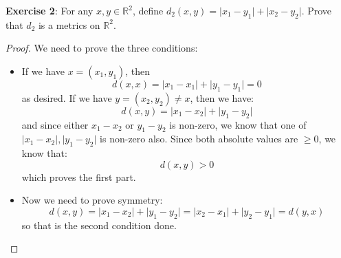 \documentclass{article}
\begin{document}
\textbf{Exercise 2}: For any $x, y \in \mathbb{R}^{2}$, define $d_{2}(x, y) = \lvert x_{1} - y_{1} \rvert + \lvert x_{2} - y_{2} \rvert$. Prove that $d_{2}$ is a metrics on $\mathbb{R}^{2}$.
    \begin{proof}
        We need to prove the three conditions:
            \begin{itemize}
                \item If we have $x = (x_{1}, y_{1})$, then 
                    \begin{equation*}
                        d(x, x) = \lvert x_{1} - x_{1} \rvert + \lvert y_{1} - y_{1} \rvert = 0
                    \end{equation*}
                as desired. If we have $y = (x_{2}, y_{2}) \neq x$, then we have:
                    \begin{equation*}
                        d(x, y) = \lvert x_{1} - x_{2} \rvert + \lvert y_{1} - y_{2} \rvert 
                    \end{equation*}
                and since either $x_{1} - x_{2}$ or $y_{1} - y_{2}$ is non-zero, we  know that one of $\lvert x_{1} - x_{2} \rvert, \lvert y_{1} - y_{2} \rvert$ is non-zero also. Since both absolute values are $ \geq 0$, we know that:
                    \begin{equation*}
                        d(x, y) > 0
                    \end{equation*}
                which proves the first part.

                \item Now we need to prove symmetry:
                    \begin{equation*}
                        d(x, y) = \lvert x_{1} - x_{2} \rvert + \lvert y_{1} - y_{2} \rvert = \lvert x_{2} - x_{1} \rvert + \lvert y_{2} - y_{1} \rvert = d(y, x)
                    \end{equation*}
                so that is the second condition done.


\end{itemize}
\end{proof}
\end{document}
